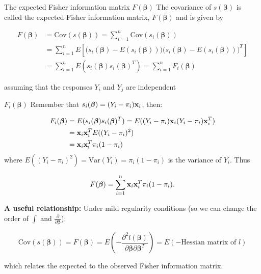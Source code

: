 \documentclass[
  ignorenonframetext,
]{beamer}
\begin{document}
\begin{frame}
\begin{block}{The expected Fisher information matrix
\(F(\boldsymbol{\beta})\)}
\protect\hypertarget{the-expected-fisher-information-matrix-fboldsymbolbeta}{}
The covariance of \(s(\boldsymbol{\beta})\) is called the expected
Fisher information matrix, \(F(\boldsymbol{\beta})\) and is given by

\[
\begin{aligned} 
F(\boldsymbol{\beta}) &= \text{Cov}(s(\boldsymbol{\beta})) = \sum_{i=1}^n \text{Cov}(s_i(\boldsymbol{\beta})) \\
&= \sum_{i=1}^n E\left[\Big(s_i(\boldsymbol{\beta}) - E(s_i(\boldsymbol{\beta}))\Big)\Big(s_i(\boldsymbol{\beta})-E(s_i(\boldsymbol{\beta}))\Big)^T\right] \\
&= \sum_{i=1}^n E(s_i(\boldsymbol{\beta})s_i(\boldsymbol{\beta})^T) = \sum_{i=1}^n F_i(\boldsymbol{\beta}) \end{aligned}
\]

assuming that the responses \(Y_i\) and \(Y_j\) are independent
\end{block}
\end{frame}

\begin{frame}
\begin{block}{\(F_i(\boldsymbol{\beta})\)}
\protect\hypertarget{f_iboldsymbolbeta}{}
Remember that \(s_i(\boldsymbol{\beta})=(Y_i-\pi_i){\bf x}_i\), then:

\[
\begin{aligned}
F_i(\boldsymbol{\beta}) &= E(s_i(\boldsymbol{\beta})s_i(\boldsymbol{\beta})^T) = E((Y_i-\pi_i){\bf x}_i(Y_i-\pi_i){\bf x}_i^T) \\
&= {\bf x}_i{\bf x}_i^T E((Y_i-\pi_i)^2)\\ 
&= {\bf x}_i{\bf x}_i^T \pi_i(1-\pi_i) 
\end{aligned}
\] where \(E((Y_i-\pi_i)^2)=\text{Var}(Y_i)=\pi_i(1-\pi_i)\) is the
variance of \(Y_i\). Thus

\[F(\boldsymbol{\beta}) = \sum_{i=1}^n {\bf x}_i{\bf x}_i^T \pi_i(1-\pi_i).\]
\end{block}
\end{frame}

\begin{frame}
\textbf{A useful relationship:} Under mild regularity conditions (so we
can change the order of \(\int\) and
\(\frac{\partial}{\partial \boldsymbol{\beta}}\)):

\[\text{Cov}(s(\boldsymbol{\beta}))=F(\boldsymbol{\beta}) = E\left( -\frac{\partial^2l(\boldsymbol{\beta})}{\partial\boldsymbol{\beta}\partial\boldsymbol{\beta}^T} \right) = E(-\text{Hessian matrix of }l)\]

which relates the expected to the observed Fisher information matrix.
\end{frame}
\end{document}
